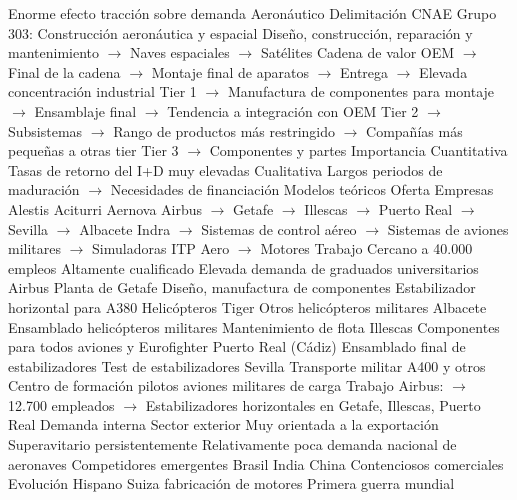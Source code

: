 \documentclass{nuevotema}
\begin{document}
\begin{esquemal}
				\4[] Enorme efecto tracción sobre demanda
		\2 Aeronáutico
			\3 Delimitación
				\4 CNAE Grupo 303: Construcción aeronáutica y espacial
				\4 Diseño, construcción, reparación y mantenimiento
				\4[] $\to$ Naves espaciales
				\4[] $\to$ Satélites
				\4 Cadena de valor
				\4[] OEM
				\4[] $\to$ Final de la cadena
				\4[] $\to$ Montaje final de aparatos
				\4[] $\to$ Entrega
				\4[] $\to$ Elevada concentración industrial
				\4[] Tier 1
				\4[] $\to$ Manufactura de componentes para montaje
				\4[] $\to$ Ensamblaje final
				\4[] $\to$ Tendencia a integración con OEM
				\4[] Tier 2
				\4[] $\to$ Subsistemas
				\4[] $\to$ Rango de productos más restringido
				\4[] $\to$ Compañías más pequeñas a otras tier
				\4[] Tier 3
				\4[] $\to$ Componentes y partes
			\3 Importancia
				\4 Cuantitativa
				\4[] Tasas de retorno del I+D muy elevadas
				\4 Cualitativa
				\4[] Largos periodos de maduración
				\4[] $\to$ Necesidades de financiación
			\3 Modelos teóricos
			\3 Oferta
				\4 Empresas
				\4[] Alestis
				\4[] Aciturri
				\4[] Aernova
				\4[] Airbus
				\4[] $\to$ Getafe
				\4[] $\to$ Illescas
				\4[] $\to$ Puerto Real
				\4[] $\to$ Sevilla
				\4[] $\to$ Albacete
				\4[] Indra
				\4[] $\to$ Sistemas de control aéreo
				\4[] $\to$ Sistemas de aviones militares
				\4[] $\to$ Simuladoras
				\4[] ITP Aero
				\4[] $\to$ Motores
				\4 Trabajo
				\4[] Cercano a 40.000 empleos
				\4[] Altamente cualificado
				\4[] Elevada demanda de graduados universitarios
			\3 Airbus
				\4 Planta de Getafe
				\4[] Diseño, manufactura de componentes
				\4[] Estabilizador horizontal para A380
				\4[] Helicópteros Tiger
				\4[] Otros helicópteros militares
				\4 Albacete
				\4[] Ensamblado helicópteros militares
				\4[] Mantenimiento de flota
				\4 Illescas
				\4[] Componentes para todos aviones y Eurofighter
				\4 Puerto Real (Cádiz)
				\4[] Ensamblado final de estabilizadores
				\4[] Test de estabilizadores
				\4 Sevilla
				\4[] Transporte militar
				\4[] A400 y otros
				\4[] Centro de formación pilotos aviones militares de carga
				\4 Trabajo
				\4[] Airbus:
				\4[] $\to$ 12.700 empleados
				\4[] $\to$ Estabilizadores horizontales en Getafe, Illescas, Puerto Real
			\3 Demanda interna
			\3 Sector exterior
				\4 Muy orientada a la exportación
				\4 Superavitario persistentemente
				\4 Relativamente poca demanda nacional de aeronaves
				\4 Competidores emergentes
				\4[] Brasil
				\4[] India
				\4[] China
				\4 Contenciosos comerciales
			\3 Evolución
				\4 Hispano Suiza fabricación de motores
				\4[] Primera guerra mundial

\end{esquemal}
\end{document}
